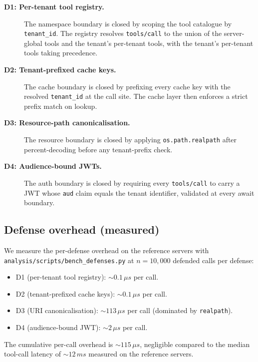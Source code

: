\documentclass[sigconf, anonymous, natbib=false]{acmart}
\begin{document}
\begin{description}
  \item[\textbf{D1: Per-tenant tool registry.}] The
        namespace boundary is closed by scoping the tool
        catalogue by \texttt{tenant\_id}. The registry
        resolves \texttt{tools/call} to the union of the
        server-global tools and the tenant's per-tenant
        tools, with the tenant's per-tenant tools taking
        precedence.
  \item[\textbf{D2: Tenant-prefixed cache keys.}] The
        cache boundary is closed by prefixing every cache
        key with the resolved \texttt{tenant\_id} at the
        call site. The cache layer then enforces a strict
        prefix match on lookup.
  \item[\textbf{D3: Resource-path canonicalisation.}]
        The resource boundary is closed by applying
        \texttt{os.path.realpath} after percent-decoding
        before any tenant-prefix check.
  \item[\textbf{D4: Audience-bound JWTs.}] The auth
        boundary is closed by requiring every
        \texttt{tools/call} to carry a JWT whose
        \texttt{aud} claim equals the tenant identifier,
        validated at every await boundary.
\end{description}

\subsection{Defense overhead (measured)}

We measure the per-defense overhead on the reference
servers with \texttt{analysis/scripts/bench\_defenses.py}
at $n = 10{,}000$ defended calls per defense:

\begin{itemize}
  \item D1 (per-tenant tool registry): $\sim 0.1\,\mu s$
        per call.
  \item D2 (tenant-prefixed cache keys): $\sim 0.1\,\mu
        s$ per call.
  \item D3 (URI canonicalisation): $\sim 113\,\mu s$ per
        call (dominated by \texttt{realpath}).
  \item D4 (audience-bound JWT): $\sim 2\,\mu s$ per call.
\end{itemize}

The cumulative per-call overhead is $\sim 115\,\mu s$,
negligible compared to the median tool-call latency of
$\sim 12\,ms$ measured on the reference servers.
\end{document}
